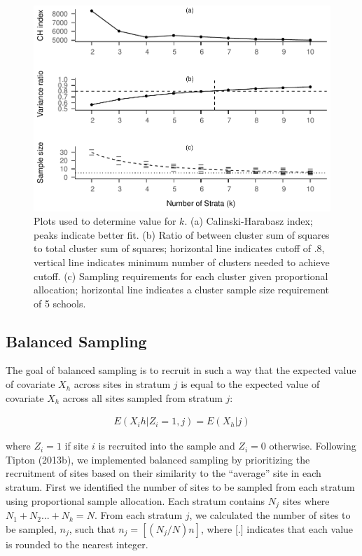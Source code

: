 \documentclass[man,floatsintext]{apa6}
\begin{document}
\begin{figure}[tbp]
\includegraphics[width=0.7\linewidth]{GenSamp_Paper_files/figure-latex/fig-k-plots-1} \caption{Plots used to determine value for $k$. (a) Calinski-Harabasz index; peaks indicate better fit. (b) Ratio of between cluster sum of squares to total cluster sum of squares; horizontal line indicates cutoff of .8, vertical line indicates minimum number of clusters needed to achieve cutoff. (c) Sampling requirements for each cluster given proportional allocation; horizontal line indicates a cluster sample size requirement of 5 schools.}\label{fig:fig-k-plots}
\end{figure}

\hypertarget{balanced-sampling}{%
\subsection{Balanced Sampling}\label{balanced-sampling}}

The goal of balanced sampling is to recruit in such a way that the expected value of covariate \(X_h\) across sites in stratum \(j\) is equal to the expected value of covariate \(X_h\) across all sites sampled from stratum \(j\):

\begin{align}
E(X_ih|Z_i = 1, j) = E(X_h|j)
\end{align}

where \(Z_i = 1\) if site \(i\) is recruited into the sample and \(Z_i = 0\) otherwise. Following Tipton (2013b), we implemented balanced sampling by prioritizing the recruitment of sites based on their similarity to the \enquote{average} site in each stratum. First we identified the number of sites to be sampled from each stratum using proportional sample allocation. Each stratum contains \(N_j\) sites where \(N_1 + N_2 ... + N_k = N\). From each stratum \(j\), we calculated the number of sites to be sampled, \(n_j\), such that \(n_j = [(N_j/N)n]\), where {[}.{]} indicates that each value is rounded to the nearest integer.
\end{document}
